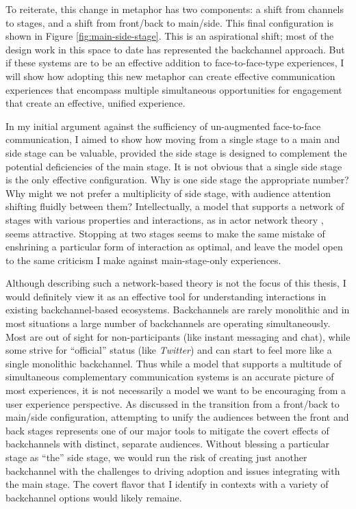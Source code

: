 To reiterate, this change in metaphor has two components: a shift from channels to stages, and a shift from front/back to main/side. This final configuration is shown in Figure \ref{fig:main-side-stage}. This is an aspirational shift; most of the design work in this space to date has represented the backchannel approach. But if these systems are to be an effective addition to face-to-face-type experiences, I will show how adopting this new metaphor can create effective communication experiences that encompass multiple simultaneous opportunities for engagement that create an effective, unified experience. 


In my initial argument against the sufficiency of un-augmented face-to-face communication, I aimed to show how moving from a single stage to a main and side stage can be valuable, provided the side stage is designed to complement the potential deficiencies of the main stage. It is not obvious that a single side stage is the only effective configuration. Why is one side stage the appropriate number? Why might we not prefer a multiplicity of side stage, with audience attention shifting fluidly between them? Intellectually, a model that supports a network of stages with various properties and interactions, as in actor network theory \citep{latour_reassembling_2007}, seems attractive. Stopping at two stages seems to make the same mistake of enshrining a particular form of interaction as optimal, and leave the model open to the same criticism I make against main-stage-only experiences.

Although describing such a network-based theory is not the focus of this thesis, I would definitely view it as an effective tool for understanding interactions in existing backchannel-based ecosystems. Backchannels are rarely monolithic and in most situations a large number of backchannels are operating simultaneously. Most are out of sight for non-participants (like instant messaging and chat), while some strive for ``official'' status (like \emph{Twitter}) and can start to feel more like a single monolithic backchannel. Thus while a model that supports a multitude of simultaneous complementary communication systems is an accurate picture of most experiences, it is not necessarily a model we want to be encouraging from a user experience perspective. As discussed in the transition from a front/back to main/side configuration, attempting to unify the audiences between the front and back stages represents one of our major tools to mitigate the covert effects of backchannels with distinct, separate audiences. Without blessing a particular stage as ``the'' side stage, we would run the risk of creating just another backchannel with the challenges to driving adoption and issues integrating with the main stage. The covert flavor that I identify in contexts with a variety of backchannel options would likely remaine.

